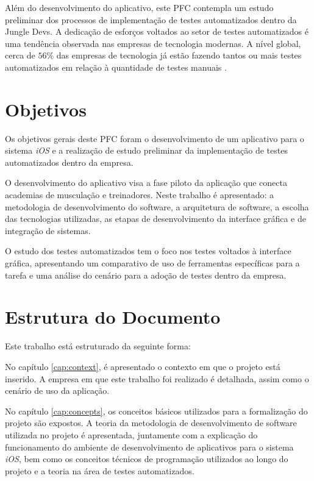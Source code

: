 Além do desenvolvimento do aplicativo, este PFC contempla um estudo preliminar dos processos de implementação de testes automatizados dentro da Jungle Devs. A dedicação de esforços voltados ao setor de testes automatizados é uma tendência observada nas empresas de tecnologia modernas. A nível global, cerca de $56\%$ das empresas de tecnologia já estão fazendo tantos ou mais testes automatizados em relação à quantidade de testes manuais . 

\section{Objetivos}
Os objetivos gerais deste PFC foram o desenvolvimento de um aplicativo para o sistema \textit{iOS} e a realização de estudo preliminar da implementação de testes automatizados dentro da empresa. 

O desenvolvimento do aplicativo visa a fase piloto da aplicação que conecta academias de musculação e treinadores. Neste trabalho é apresentado: a metodologia de desenvolvimento do software, a arquitetura de software, a escolha das tecnologias utilizadas, as etapas de desenvolvimento da interface gráfica e de integração de sistemas. 

O estudo dos testes automatizados tem o foco nos testes voltados à interface gráfica, apresentando um comparativo de uso de ferramentas específicas para a tarefa e uma análise do cenário para a adoção de testes dentro da empresa.

\section{Estrutura do Documento}
Este trabalho está estruturado da seguinte forma: 

No capítulo \ref{cap:context}, é apresentado o contexto em que o projeto está inserido. A empresa em que este trabalho foi realizado é detalhada, assim como o cenário de uso da aplicação.

No capítulo \ref{cap:concepts}, os conceitos básicos utilizados para a formalização do projeto são expostos. A teoria da metodologia de desenvolvimento de software utilizada no projeto é apresentada, juntamente com a explicação do funcionamento do ambiente de desenvolvimento de aplicativos para o sistema \textit{iOS}, bem como os conceitos técnicos de programação utilizados ao longo do projeto e a teoria na área de testes automatizados.


